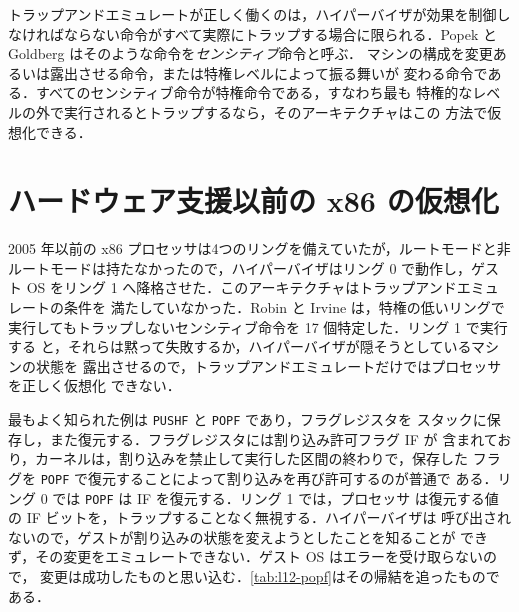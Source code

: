 \documentclass[../main.tex]{subfiles}
\begin{document}
\begin{note}
  トラップアンドエミュレートが正しく働くのは，ハイパーバイザが効果を制御し
  なければならない命令がすべて実際にトラップする場合に限られる．Popek と
  Goldberg \cite{popek1974} はそのような命令を\emph{センシティブ}命令と呼ぶ．
  マシンの構成を変更あるいは露出させる命令，または特権レベルによって振る舞いが
  変わる命令である．すべてのセンシティブ命令が特権命令である，すなわち最も
  特権的なレベルの外で実行されるとトラップするなら，そのアーキテクチャはこの
  方法で仮想化できる．
\end{note}

\section{ハードウェア支援以前の x86 の仮想化}
\label{sec:l12-x86}

2005 年以前の x86 プロセッサは4つのリングを備えていたが，ルートモードと非
ルートモードは持たなかったので，ハイパーバイザはリング 0 で動作し，ゲスト OS
をリング 1 へ降格させた．このアーキテクチャはトラップアンドエミュレートの条件を
満たしていなかった．Robin と Irvine \cite{robin2000} は，特権の低いリングで
実行してもトラップしないセンシティブ命令を 17 個特定した．リング 1 で実行する
と，それらは黙って失敗するか，ハイパーバイザが隠そうとしているマシンの状態を
露出させるので，トラップアンドエミュレートだけではプロセッサを正しく仮想化
できない．

最もよく知られた例は \texttt{PUSHF} と \texttt{POPF} であり，フラグレジスタを
スタックに保存し，また復元する．フラグレジスタには割り込み許可フラグ IF が
含まれており，カーネルは，割り込みを禁止して実行した区間の終わりで，保存した
フラグを \texttt{POPF} で復元することによって割り込みを再び許可するのが普通で
ある．リング 0 では \texttt{POPF} は IF を復元する．リング 1 では，プロセッサ
は復元する値の IF ビットを，トラップすることなく無視する．ハイパーバイザは
呼び出されないので，ゲストが割り込みの状態を変えようとしたことを知ることが
できず，その変更をエミュレートできない．ゲスト OS はエラーを受け取らないので，
変更は成功したものと思い込む．\cref{tab:l12-popf}はその帰結を追ったもので
ある．
\end{document}
